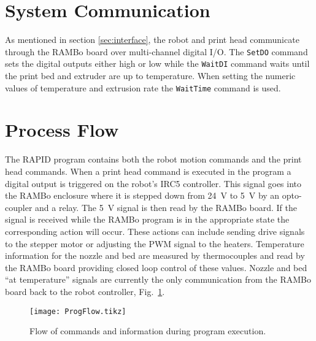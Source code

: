 \documentclass[main.tex]{subfiles}
\begin{document}
\section{System Communication}
As mentioned in section \ref{sec:interface}, the robot and print head communicate through the RAMBo board over multi-channel digital I/O.
The \texttt{SetDO} command sets the digital outputs either high or low while the \texttt{WaitDI} command waits until the print bed and extruder are up to temperature.
When setting the numeric values of temperature and extrusion rate the \texttt{WaitTime} command is used.


\section{Process Flow}
The RAPID program contains both the robot motion commands and the print head commands.
When a print head command is executed in the program a digital output is triggered on the robot's IRC5 controller.
This signal goes into the RAMBo enclosure where it is stepped down from \SI{24}{V} to \SI{5}{V} by an opto-coupler and a relay.
The \SI{5}{V} signal is then read by the RAMBo board.
If the signal is received while the RAMBo program is in the appropriate state the corresponding action will occur.
These actions can include sending drive signals to the stepper motor or adjusting the PWM signal to the heaters.
Temperature information for the nozzle and bed are measured by thermocouples and read by the RAMBo board providing closed loop control of these values.
Nozzle and bed ``at temperature'' signals are currently the only communication from the RAMBo board back to the robot controller, Fig.~\ref{fig:progflow}.

\begin{figure}
\centering
    \texttt{[image: ProgFlow.tikz]}
\caption{Flow of commands and information during program execution.}
\label{fig:progflow}
\end{figure}
\end{document}
